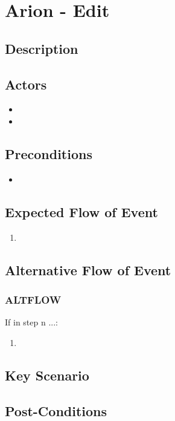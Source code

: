 \documentclass{scrreprt}
\begin{document}
\chapter*{Arion - Edit}

\section*{Description}

\section*{Actors}
\begin{itemize}
    \item 
    \item 
\end{itemize}

\section*{Preconditions}
\begin{itemize}
    \item 
\end{itemize}

\section*{Expected Flow of Event}
\begin{enumerate}[1.]
    \item 
\end{enumerate}

\section*{Alternative Flow of Event}
\subsection*{ALTFLOW}
If in step n ...:
\begin{enumerate}
    \item 
\end{enumerate}

\section*{Key Scenario}

\section*{Post-Conditions}
\end{document}
